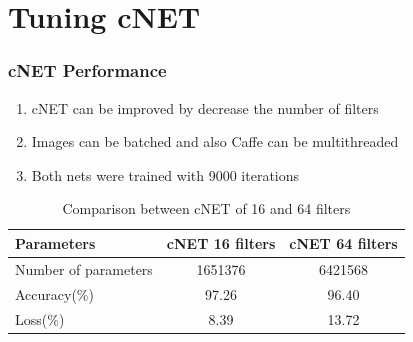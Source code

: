 \documentclass[10pt,a4paper]{beamer}
\begin{document}
\section{Tuning cNET}
\begin{frame}
\frametitle{cNET Performance}
\begin{enumerate}
\item cNET can be improved by decrease the number of filters
\item Images can be batched and also Caffe can be multithreaded
\item Both nets were trained with 9000 iterations
\end{enumerate}
\begin{table}[h]
\centering
\renewcommand{\arraystretch}{1.2}
\caption{Comparison between cNET of 16 and 64 filters}
\label{table:3}
\begin{tabular}{|l c c |} 
 \hline
 \textbf{Parameters} & \textbf{cNET 16 filters} & \textbf{cNET 64 filters} \\ [0.75ex] 
 \hline
 Number of parameters & 1651376 & 6421568 \\ 
 Accuracy(\%) & 97.26 & 96.40 \\
 Loss(\%) & 8.39 & 13.72 \\ [1ex] 
 \hline 
\end{tabular}
\end{table}
\end{frame}
\end{document}
